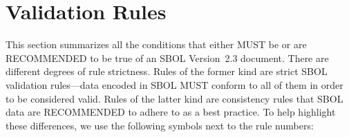 \newcommand{\printValid}{\validRule{sbol-\arabic{sbolCtr}\addtocounter{sbolCtr}{1}}}
\newcommand{\printComplete}{\completeRule{sbol-\arabic{sbolCtr}\addtocounter{sbolCtr}{1}}}
\newcommand{\printWarning}{\consistencyRule{sbol-\arabic{sbolCtr}\addtocounter{sbolCtr}{1}}}
\newcommand{\printModeling}{\modelingRule{sbol-\arabic{sbolCtr}\addtocounter{sbolCtr}{1}}}

\section{Validation Rules}
\label{validation}

This section summarizes all the conditions that either MUST be or 
are RECOMMENDED to be true of an SBOL Version~2.3 document. There are different degrees of rule strictness.  
Rules of the former kind are strict SBOL validation rules---data encoded in SBOL MUST conform to
all of them in order to be considered valid. Rules of the latter kind
are consistency rules that SBOL data are RECOMMENDED to adhere to as a best practice.  To help highlight these differences, we use the
following symbols next to the rule numbers:


